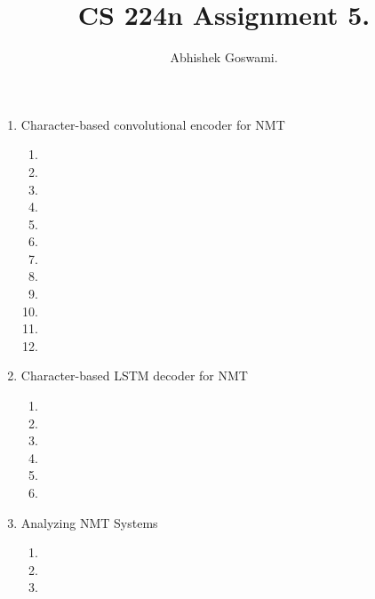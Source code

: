 \documentclass[]{article}
\begin{document}
\title{CS 224n Assignment 5.}
\author{Abhishek Goswami.}
\maketitle

\begin{enumerate}
	\item Character-based convolutional encoder for NMT
	\begin{enumerate}
		\item
		\item
		\item
		\item
		\item
		\item
		\item
		\item
		\item
		\item
		\item
		\item
		
	\end{enumerate}
	
	\item Character-based LSTM decoder for NMT
	\begin{enumerate}
		\item
		\item
		\item
		\item
		\item
		\item
	\end{enumerate}
	
	\item Analyzing NMT Systems
	\begin{enumerate}
		\item
		\item
		\item
	\end{enumerate}
	
\end{enumerate}
\end{document}
